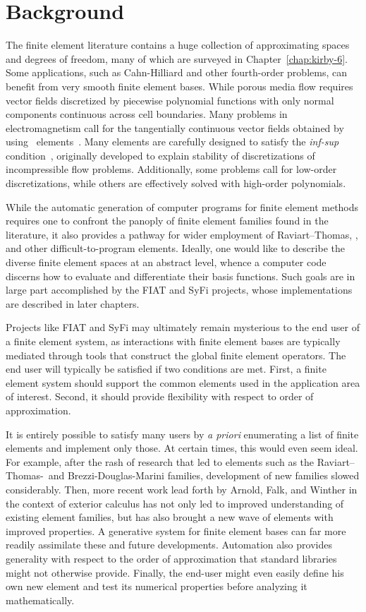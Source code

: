\section{Background}
The finite element literature contains a huge collection of
approximating spaces and degrees of freedom, many of which are
surveyed in Chapter~\ref{chap:kirby-6}.
Some applications, such as Cahn-Hilliard and
other fourth-order problems, can benefit from very smooth finite
element bases.  While porous media flow requires
vector fields discretized by piecewise polynomial functions with
only normal components continuous across cell boundaries.  Many problems in
electromagnetism call for the tangentially continuous vector fields obtained
by using \nedelec\ elements~\citep{Nedelec1980,Nedelec1986}.  Many elements are carefully designed
to satisfy the \emph{inf-sup} condition~\citep{BrezziFortin1991,GiraultRaviart1986},
originally developed to explain stability of discretizations of
incompressible flow problems.  Additionally, some problems call for low-order
discretizations, while others are effectively solved with high-order
polynomials.

While the automatic generation of computer programs for finite element
methods requires one to confront the panoply of  finite
element families found in the literature, it also provides a pathway
for wider employment of Raviart--Thomas, \nedelec, and other
difficult-to-program elements.
Ideally, one would like to
describe the diverse finite element spaces at an abstract level,
whence a computer code discerns how to evaluate and differentiate
their basis functions.  Such goals are in large part accomplished by
the FIAT and SyFi projects, whose implementations are described in
later chapters.

Projects like FIAT and SyFi may ultimately remain
mysterious to the end user of a
finite element system, as
interactions with finite element bases are typically mediated through
tools that construct the global finite element operators.
The end user will typically be satisfied if two conditions are met.
First, a finite element system
should support the common elements used in the application
area of interest.  Second, it should provide flexibility with respect
to order of approximation.

It is entirely possible to satisfy many users by \emph{a priori}
enumerating a list of finite elements and implement only those.  At certain times, this
would even seem ideal.  For example, after the rash of research
that led to elements such as the Raviart--Thomas-\nedelec\ and
Brezzi-Douglas-Marini families, development of new families slowed
considerably.  Then, more recent work lead forth by  Arnold, Falk, and Winther in the context of exterior
calculus has not only led to
improved understanding of existing element families, but has also
brought a new wave of elements with improved properties.  A
generative system for finite element bases can far more
readily assimilate these and future developments.
Automation also provides generality with respect to the order of approximation that standard libraries
might not otherwise provide. Finally, the end-user might even easily define his own new element
and test its numerical properties before analyzing it mathematically.


